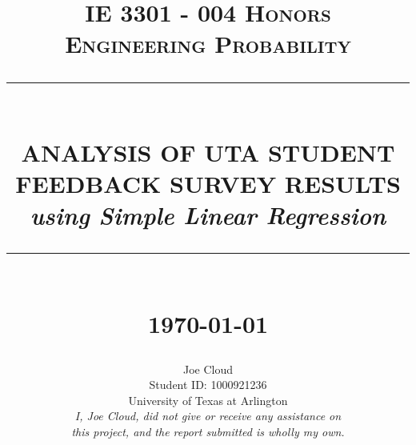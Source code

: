 \documentclass[10pt]{report}
\newcommand{\HRule}[1]{\rule{\linewidth}{#1}}
\begin{document}
\title{ \normalsize \textsc{IE 3301 - 004 Honors\\ Engineering Probability}
        \\ [2.0cm]
        \HRule{0.5pt} \\
        \LARGE \textbf{\uppercase{Analysis of UTA Student Feedback Survey Results}} \\
        \normalsize \textit{using Simple Linear Regression}
        \HRule{2pt} \\ [0.5cm]
        \normalsize \today \vspace*{5\baselineskip}}

\date{}

\author{
    Joe Cloud \\
        Student ID: 1000921236 \\
        University of Texas at Arlington \\[1in]
        \textit{I, Joe Cloud, did not give or receive any assistance on }\\
        \textit{this project, and the report submitted is wholly my own.}}



    \maketitle
\tableofcontents
\newpage

\sectionfont{\scshape}

\end{document}
